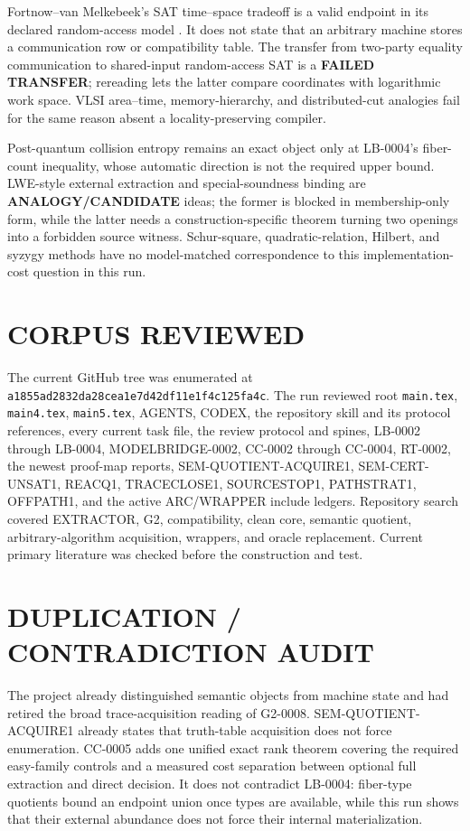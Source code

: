 \documentclass[11pt]{article}
\begin{document}
Fortnow--van Melkebeek's SAT time--space tradeoff is a valid endpoint in its
declared random-access model \cite{fvm}.  It does not state that an arbitrary
machine stores a communication row or compatibility table.  The transfer from
two-party equality communication to shared-input random-access SAT is a
\textbf{FAILED TRANSFER}; rereading lets the latter compare coordinates with
logarithmic work space.  VLSI area--time, memory-hierarchy, and distributed-cut
analogies fail for the same reason absent a locality-preserving compiler.

Post-quantum collision entropy remains an exact object only at LB-0004's
fiber-count inequality, whose automatic direction is not the required upper
bound.  LWE-style external extraction and special-soundness binding are
\textbf{ANALOGY/CANDIDATE} ideas; the former is blocked in membership-only
form, while the latter needs a construction-specific theorem turning two
openings into a forbidden source witness.  Schur-square, quadratic-relation,
Hilbert, and syzygy methods have no model-matched correspondence to this
implementation-cost question in this run.

\section{CORPUS REVIEWED}
The current GitHub tree was enumerated at
\texttt{a1855ad2832da28cea1e7d42df11e1f4c125fa4c}.  The run reviewed root
\texttt{main.tex}, \texttt{main4.tex}, \texttt{main5.tex}, AGENTS, CODEX, the
repository skill and its protocol references, every current task file, the
review protocol and spines, LB-0002 through LB-0004, MODELBRIDGE-0002, CC-0002
through CC-0004, RT-0002, the newest proof-map reports, SEM-QUOTIENT-ACQUIRE1,
SEM-CERT-UNSAT1, REACQ1, TRACECLOSE1, SOURCESTOP1, PATHSTRAT1, OFFPATH1, and
the active ARC/WRAPPER include ledgers.  Repository search covered EXTRACTOR,
G2, compatibility, clean core, semantic quotient, arbitrary-algorithm
acquisition, wrappers, and oracle replacement.  Current primary literature
was checked before the construction and test.

\section{DUPLICATION / CONTRADICTION AUDIT}
The project already distinguished semantic objects from machine state and had
retired the broad trace-acquisition reading of G2-0008.  SEM-QUOTIENT-ACQUIRE1
already states that truth-table acquisition does not force enumeration.
CC-0005 adds one unified exact rank theorem covering the required easy-family
controls and a measured cost separation between optional full extraction and
direct decision.  It does not contradict LB-0004: fiber-type quotients bound
an endpoint union once types are available, while this run shows that their
external abundance does not force their internal materialization.
\end{document}
